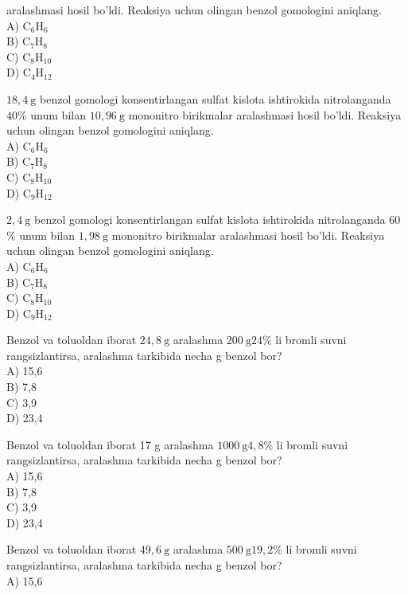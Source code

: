 aralashmasi hosil bo'ldi. Reaksiya uchun olingan benzol gomologini aniqlang.\\
A) $\mathrm{C}_{6} \mathrm{H}_{6}$\\
B) $\mathrm{C}_{7} \mathrm{H}_{8}$\\
C) $\mathrm{C}_{8} \mathrm{H}_{10}$\\
D) $\mathrm{C}_{4} \mathrm{H}_{12}$
  \item $18,4 \mathrm{~g}$ benzol gomologi konsentirlangan sulfat kislota ishtirokida nitrolanganda $40 \%$ unum bilan $10,96 \mathrm{~g}$ mononitro birikmalar aralashmasi hosil bo'ldi. Reaksiya uchun olingan benzol gomologini aniqlang.\\
A) $\mathrm{C}_{6} \mathrm{H}_{6}$\\
B) $\mathrm{C}_{7} \mathrm{H}_{8}$\\
C) $\mathrm{C}_{8} \mathrm{H}_{10}$\\
D) $\mathrm{C}_{9} \mathrm{H}_{12}$
  \item $2,4 \mathrm{~g}$ benzol gomologi konsentirlangan sulfat kislota ishtirokida nitrolanganda 60 $\%$ unum bilan $1,98 \mathrm{~g}$ mononitro birikmalar aralashmasi hosil bo'ldi. Reaksiya uchun olingan benzol gomologini aniqlang.\\
A) $\mathrm{C}_{6} \mathrm{H}_{6}$\\
B) $\mathrm{C}_{7} \mathrm{H}_{8}$\\
C) $\mathrm{C}_{8} \mathrm{H}_{10}$\\
D) $\mathrm{C}_{9} \mathrm{H}_{12}$
  \item Benzol va toluoldan iborat $24,8 \mathrm{~g}$ aralashma $200 \mathrm{~g} 24 \%$ li bromli suvni rangsizlantirsa, aralashma tarkibida necha g benzol bor?\\
A) 15,6\\
B) 7,8\\
C) 3,9\\
D) 23,4
  \item Benzol va toluoldan iborat 17 g aralashma $1000 \mathrm{~g} 4,8 \%$ li bromli suvni rangsizlantirsa, aralashma tarkibida necha g benzol bor?\\
A) 15,6\\
B) 7,8\\
C) 3,9\\
D) 23,4
  \item Benzol va toluoldan iborat $49,6 \mathrm{~g}$ aralashma $500 \mathrm{~g} 19,2 \%$ li bromli suvni rangsizlantirsa, aralashma tarkibida necha g benzol bor?\\
A) 15,6\\
